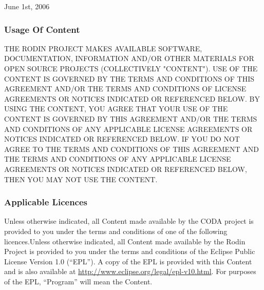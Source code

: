 June 1st, 2006

\subsubsection{Usage Of Content}
\label{sec:usage-content}

THE RODIN PROJECT MAKES AVAILABLE SOFTWARE, DOCUMENTATION, INFORMATION AND/OR OTHER MATERIALS FOR OPEN SOURCE PROJECTS (COLLECTIVELY "CONTENT"). USE OF THE CONTENT IS GOVERNED BY THE TERMS AND CONDITIONS OF THIS AGREEMENT AND/OR THE TERMS AND CONDITIONS OF LICENSE AGREEMENTS OR NOTICES INDICATED OR REFERENCED BELOW. BY USING THE CONTENT, YOU AGREE THAT YOUR USE OF THE CONTENT IS GOVERNED BY THIS AGREEMENT AND/OR THE TERMS AND CONDITIONS OF ANY APPLICABLE LICENSE AGREEMENTS OR NOTICES INDICATED OR REFERENCED BELOW. IF YOU DO NOT AGREE TO THE TERMS AND CONDITIONS OF THIS AGREEMENT AND THE TERMS AND CONDITIONS OF ANY APPLICABLE LICENSE AGREEMENTS OR NOTICES INDICATED OR REFERENCED BELOW, THEN YOU MAY NOT USE THE CONTENT.

\subsubsection{Applicable Licences}
\label{sec:applicable-licences}

Unless otherwise indicated, all Content made available by the CODA
project is provided to you under the terms and conditions of one of
the following licences.Unless otherwise indicated, all Content made available by the Rodin Project is provided to you under the terms and conditions of the Eclipse Public License Version 1.0 (``EPL''). A copy of the EPL is provided with this Content and is also available at \url{http://www.eclipse.org/legal/epl-v10.html}. For purposes of the EPL, ``Program'' will mean the Content.

